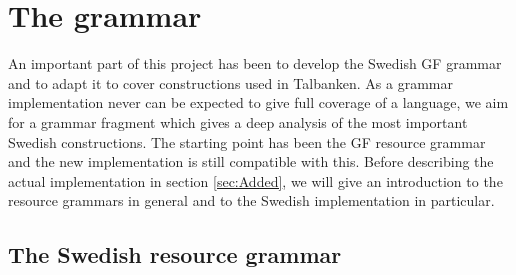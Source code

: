 \documentclass{report}
\begin{document}
\chapter{The grammar}
\label{sec:prog.grammar}
An important part of this project has been to develop the Swedish GF grammar and
to adapt it to cover
constructions used in Talbanken. As a grammar implementation never can be
expected to give
full coverage of a language, we aim for a grammar fragment which gives a deep
analysis of the most important Swedish constructions.
The starting point has been the GF resource grammar and the new implementation is
still compatible with this.
Before describing the actual implementation in section \ref{sec:Added}, we will give an introduction to the
resource grammars in general and to the Swedish implementation in particular.



\section{The Swedish resource grammar}
\label{sec:swegf}
\end{document}

